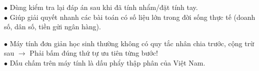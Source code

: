 \documentclass[14pt,a4paper,oneside]{extbook}
\begin{document}
\vspace{3mm}

\noindent
\begin{minipage}[t]{0.54\textwidth}
  \begin{tcolorbox}[
    enhanced,
    title={\footnotesize\bfseries\color{white}\faCheckCircle\ Sử dụng máy tính như một công cụ hỗ trợ},
    colback=green!3!white,
    colframe=green!60!black,
    arc=2.5mm, boxrule=0.8pt, top=1.8mm, bottom=1.8mm, left=2.2mm, right=2.2mm
  ]
    \footnotesize
    $\bullet$ Dùng kiểm tra lại đáp án sau khi đã tính nhẩm/đặt tính tay.\\
    $\bullet$ Giúp giải quyết nhanh các bài toán có số liệu lớn trong đời sống thực tế (doanh số, dân số, tiền gửi ngân hàng).
  \end{tcolorbox}
\end{minipage}%
\hfill
\begin{minipage}[t]{0.44\textwidth}
  \begin{tcolorbox}[
    enhanced,
    title={\footnotesize\bfseries\color{white}\faExclamationTriangle\ Mẹo tránh bẫy trắc nghiệm},
    colback=red!2!white,
    colframe=red!70!black,
    arc=2.5mm, boxrule=0.8pt, top=1.8mm, bottom=1.8mm, left=2.2mm, right=2.2mm
  ]
    \footnotesize
    $\bullet$ Máy tính đơn giản học sinh thường không có quy tắc nhân chia trước, cộng trừ sau $\rightarrow$ Phải bấm đúng thứ tự ưu tiên từng bước!\\
    $\bullet$ Dấu chấm trên máy tính là dấu phẩy thập phân của Việt Nam.
  \end{tcolorbox}
\end{minipage}
\end{document}

